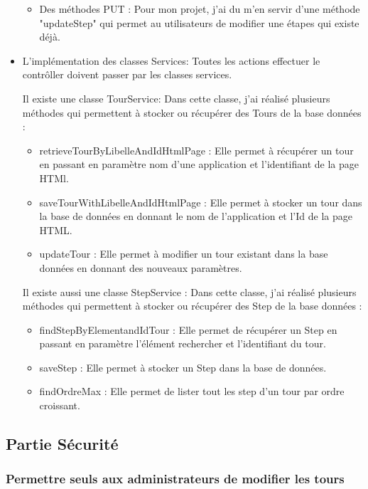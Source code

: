 \documentclass[12pt]{article}
\begin{document}
\begin{itemize}
\begin{itemize}
\item Des méthodes PUT : Pour mon projet, j'ai du m’en servir  d'une méthode "updateStep" qui permet au utilisateurs de modifier une étapes qui existe déjà.

\end{itemize}
\item L'implémentation des classes Services: Toutes les actions effectuer le contrôller doivent passer par les classes services. 

Il existe une classe TourService: Dans cette classe, j'ai réalisé plusieurs méthodes qui permettent à stocker ou récupérer des Tours de la base données : 
\begin{itemize}
\item  retrieveTourByLibelleAndIdHtmlPage : Elle permet à récupérer un tour en passant en paramètre nom d'une application et l'identifiant de la page HTMl. 

\item saveTourWithLibelleAndIdHtmlPage : Elle permet à stocker un tour dans la base de données en donnant le nom de l'application et l'Id de la page HTML. 

\item updateTour : Elle permet à modifier un tour existant dans la base données en donnant des nouveaux paramètres. 
\end{itemize}

Il existe aussi une classe StepService : Dans cette classe, j'ai réalisé plusieurs méthodes qui permettent à stocker ou récupérer des Step de la base données : 
\begin{itemize}

\item  findStepByElementandIdTour : Elle permet de récupérer un Step en passant en paramètre l'élément rechercher et l'identifiant du tour.

\item saveStep : Elle permet à stocker un Step dans la base de données.

\item findOrdreMax : Elle permet de lister tout les step d'un tour par ordre croissant.  
\end{itemize}
\end{itemize}
\subsection{Partie Sécurité}
\subsubsection{Permettre seuls aux administrateurs de modifier les tours}
\end{document}
